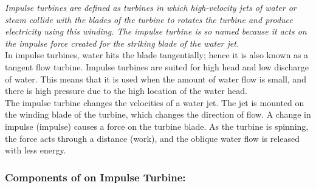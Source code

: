 \documentclass[11pt]{article}
\begin{document}
\textit{Impulse turbines are defined as turbines in which high-velocity jets of water or steam collide with the blades of the turbine to rotates the turbine and produce electricity using this winding. The impulse turbine is so named because it acts on the impulse force created for the striking blade of the water jet.}\\


In impulse turbines, water hits the blade tangentially; hence it is also known as a tangent flow turbine. Impulse turbines are suited for high head and low discharge of water. This means that it is used when the amount of water flow is small, and there is high pressure due to the high location of the water head.\\

The impulse turbine changes the velocities of a water jet. The jet is mounted on the winding blade of the turbine, which changes the direction of flow. A change in impulse (impulse) causes a force on the turbine blade. As the turbine is spinning, the force acts through a distance (work), and the oblique water flow is released with less energy.  \\



\subsubsection{Components of on Impulse Turbine:}
\end{document}
